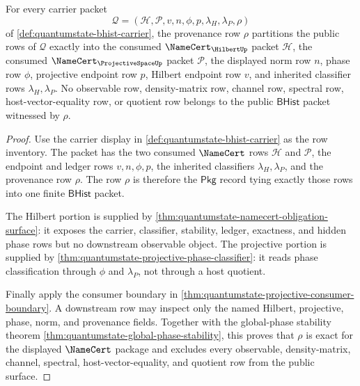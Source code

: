 \begin{theorem}
\label{thm:quantumstate-provenance-row-exactness}
For every carrier packet
$$
\mathcal{Q}=(\mathcal{H},\mathcal{P},v,n,\phi,p,\lambda_H,\lambda_P,\rho)
$$
of \autoref{def:quantumstate-bhist-carrier}, the provenance row $\rho$
partitions the public rows of $\mathcal{Q}$ exactly into the consumed
$\NameCert_{\HilbertUp}$ packet $\mathcal{H}$, the consumed
$\NameCert_{\ProjectiveSpaceUp}$ packet $\mathcal{P}$, the displayed
norm row $n$, phase row $\phi$, projective endpoint row $p$, Hilbert
endpoint row $v$, and inherited classifier rows $\lambda_H,\lambda_P$.
No observable row, density-matrix row, channel row, spectral row,
host-vector-equality row, or quotient row belongs to the public
$\mathsf{BHist}$ packet witnessed by $\rho$.
\end{theorem}
\begin{proof}
Use the carrier display in \autoref{def:quantumstate-bhist-carrier} as the
row inventory. The packet has the two consumed $\NameCert$ rows
$\mathcal{H}$ and $\mathcal{P}$, the endpoint and ledger rows
$v,n,\phi,p$, the inherited classifiers $\lambda_H,\lambda_P$, and the
provenance row $\rho$. The row $\rho$ is therefore the $\mathsf{Pkg}$
record tying exactly those rows into one finite $\mathsf{BHist}$ packet.

The Hilbert portion is supplied by
\autoref{thm:quantumstate-namecert-obligation-surface}: it exposes the
carrier, classifier, stability, ledger, exactness, and hidden phase rows
but no downstream observable object. The projective portion is supplied by
\autoref{thm:quantumstate-projective-phase-classifier}: it reads phase
classification through $\phi$ and $\lambda_P$, not through a host quotient.

Finally apply the consumer boundary in
\autoref{thm:quantumstate-projective-consumer-boundary}. A downstream row
may inspect only the named Hilbert, projective, phase, norm, and provenance
fields. Together with the global-phase stability theorem
\autoref{thm:quantumstate-global-phase-stability}, this proves that
$\rho$ is exact for the displayed $\NameCert$ package and excludes every
observable, density-matrix, channel, spectral, host-vector-equality, and
quotient row from the public surface.
\end{proof}
